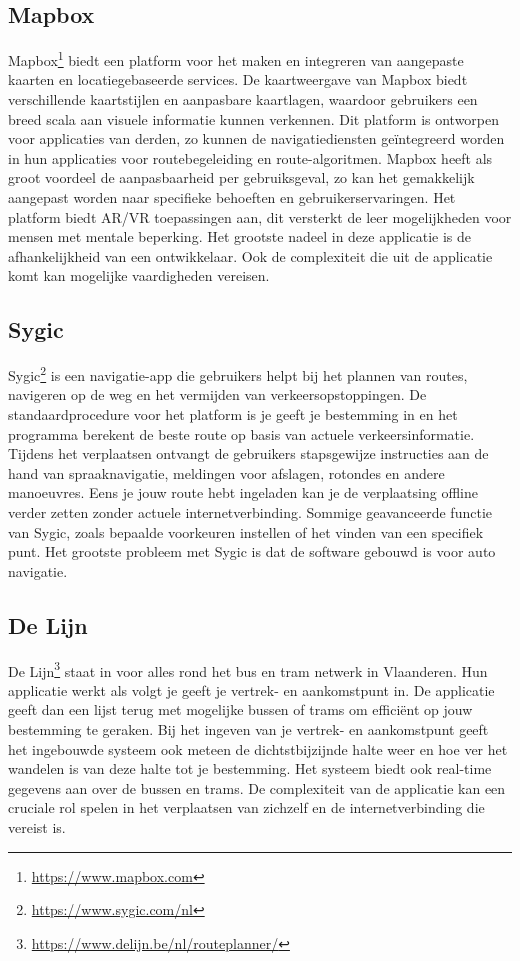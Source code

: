 \subsection{Mapbox}
\label{sec:mapbox}
Mapbox\footnote{\url{https://www.mapbox.com}} biedt een platform voor het maken en integreren van aangepaste kaarten en locatiegebaseerde services. De kaartweergave van Mapbox biedt verschillende kaartstijlen en aanpasbare kaartlagen, waardoor gebruikers een breed scala aan visuele informatie kunnen verkennen. Dit platform is ontworpen voor applicaties van derden, zo kunnen de navigatiediensten geïntegreerd worden in hun applicaties voor routebegeleiding en route-algoritmen. Mapbox heeft als groot voordeel de aanpasbaarheid per gebruiksgeval, zo kan het gemakkelijk aangepast worden naar specifieke behoeften en gebruikerservaringen. Het platform biedt AR/VR toepassingen aan, dit versterkt de leer mogelijkheden voor mensen met mentale beperking. Het grootste nadeel in deze applicatie is de afhankelijkheid van een ontwikkelaar. Ook de complexiteit die uit de applicatie komt kan mogelijke vaardigheden vereisen.
\subsection{Sygic}
\label{sec:sygic}
Sygic\footnote{\url{https://www.sygic.com/nl}} is een navigatie-app die gebruikers helpt bij het plannen van routes, navigeren op de weg en het vermijden van verkeersopstoppingen. De standaardprocedure voor het platform is je geeft je bestemming in en het programma berekent de beste route op basis van actuele verkeersinformatie. Tijdens het verplaatsen ontvangt de gebruikers stapsgewijze instructies aan de hand van spraaknavigatie, meldingen voor afslagen, rotondes en andere manoeuvres. Eens je jouw route hebt ingeladen kan je de verplaatsing offline verder zetten zonder actuele internetverbinding. Sommige geavanceerde functie van Sygic, zoals bepaalde voorkeuren instellen of het vinden van een specifiek punt. Het grootste probleem met Sygic is dat de software gebouwd is voor auto navigatie.
\subsection{De Lijn}
\label{sec:delijn}
De Lijn\footnote{\url{https://www.delijn.be/nl/routeplanner/}} staat in voor alles rond het bus en tram netwerk in Vlaanderen. Hun applicatie werkt als volgt je geeft je vertrek- en aankomstpunt in. De applicatie geeft dan een lijst terug met mogelijke bussen of trams om efficiënt op jouw bestemming te geraken. Bij het ingeven van je vertrek- en aankomstpunt geeft het ingebouwde systeem ook meteen de dichtstbijzijnde halte weer en hoe ver het wandelen is van deze halte tot je bestemming. Het systeem biedt ook real-time gegevens aan over de bussen en trams. De complexiteit van de applicatie kan een cruciale rol spelen in het verplaatsen van zichzelf en de internetverbinding die vereist is.
